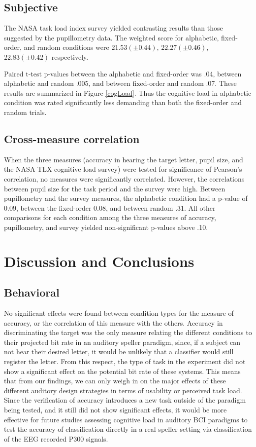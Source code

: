 \documentclass[10pt]{article}
\begin{document}
\subsection{Subjective}

The NASA task load index survey yielded contrasting results than
those suggested by the pupillometry data.  
The weighted score for alphabetic, fixed-order, and random
conditions were 
$21.53 (\pm 0.44)$, $22.27 (\pm 0.46)$, $22.83 (\pm
0.42)$ respectively.

Paired t-test p-values between the alphabetic and fixed-order was
.04, between alphabetic and random .005, and between fixed-order
and random .07.  These results are summarized in Figure
\ref{cogLoad}.  Thus the cognitive load in alphabetic condition was
rated significantly less demanding than both the fixed-order and
random trials.

\subsection{Cross-measure correlation} 
When the three measures
(accuracy in hearing the target letter, pupil size, and the NASA TLX
cognitive load survey) were tested for significance of Pearson's
correlation, no measures were significantly correlated.  However,
the correlations between pupil size for the task period and the
survey were high.  Between pupillometry and the survey measures,
the alphabetic condition had a p-value of 0.09, between the
fixed-order 0.08, and between random .31.  All other comparisons
for each condition among the three measures of accuracy, pupillometry, and survey
yielded non-significant p-values above .10.

\section{Discussion and Conclusions}

\subsection{Behavioral}

No significant effects were found between condition types for
the measure of accuracy, or the correlation of this measure
with the others.  Accuracy in discriminating the target was
the only measure relating the different conditions to their
projected bit rate in an auditory speller paradigm, since, if
a subject can not hear their desired letter, it would be
unlikely that a classifier would still register the letter.
From this respect, the type of task in the experiment did not
show a significant effect on the potential bit rate of these
systems. This means that from our findings, we can only weigh
in on the major effects of these different auditory design
strategies in terms of usability or perceived task load. Since
the verification of accuracy introduces a new task outside of
the paradigm being tested, and it still did not show
significant effects, it would be more effective for future
studies assessing cognitive load in auditory BCI paradigms to
test the accuracy of classification directly in a real speller
setting via classification of the EEG recorded P300 signals.
\end{document}
